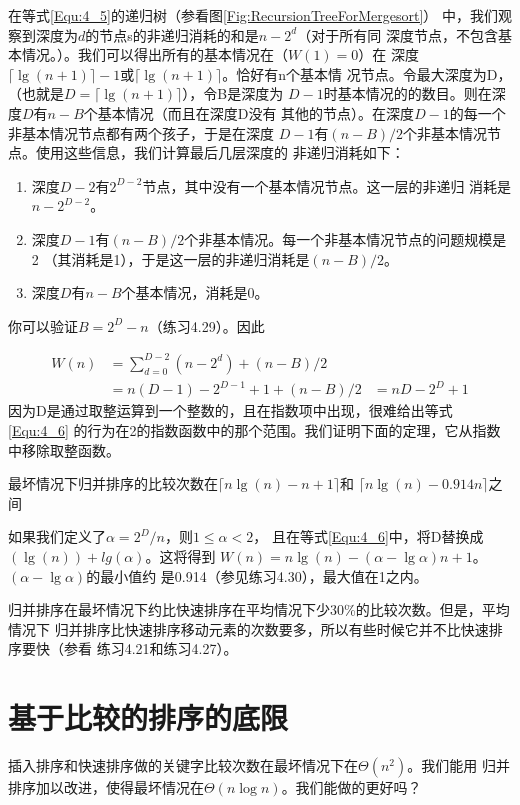 在等式\ref{Equ:4_5}的递归树（参看图\ref{Fig:RecursionTreeForMergesort}）
中，我们观察到深度为$d$的节点s的非递归消耗的和是$n-2^d$（对于所有同
深度节点，不包含基本情况。）。我们可以得出所有的基本情况在（$W(1)=0$）在
深度$\lceil \lg(n+1)\rceil -1$或$\lceil\lg(n+1) \rceil$。恰好有n个基本情
况节点。令最大深度为D，（也就是$D=\lceil\lg(n+1) \rceil$），令B是深度为
$D-1$时基本情况的的数目。则在深度$D$有$n-B$个基本情况（而且在深度D没有
其他的节点）。在深度$D-1$的每一个非基本情况节点都有两个孩子，于是在深度
$D-1$有$(n-B)/2$个非基本情况节点。使用这些信息，我们计算最后几层深度的
非递归消耗如下：
\begin{enumerate}
\item 深度$D-2$有$2^{D-2}$节点，其中没有一个基本情况节点。这一层的非递归
    消耗是$n-2^{D-2}$。
\item 深度$D-1$有$(n-B)/2$个非基本情况。每一个非基本情况节点的问题规模是2
（其消耗是1），于是这一层的非递归消耗是$(n-B)/2$。
\item 深度$D$有$n-B$个基本情况，消耗是0。
\end{enumerate}
你可以验证$B=2^D-n$（练习4.29）。因此

\begin{equation}\label{Equ:4_6}
\begin{aligned}
W(n)&=\sum_{d=0}^{D-2}(n-2^d)+(n-B)/2\\
&=n(D-1)-2^{D-1}+1+(n-B)/2
&=nD-2^D+1
\end{aligned}
\end{equation}
因为D是通过取整运算到一个整数的，且在指数项中出现，很难给出等式\ref{Equ:4_6}
的行为在2的指数函数中的那个范围。我们证明下面的定理，它从指数中移除取整函数。

\begin{theorem}\label{Theorem:4_6}
最坏情况下归并排序的比较次数在$\lceil n\lg(n)-n+1 \rceil$和
$\lceil n\lg(n)-0.914n \rceil$之间

 如果我们定义了$\alpha = 2^D/n$，则$1\leq \alpha <2$，
且在等式\ref{Equ:4_6}中，将D替换成$(\lg(n))+lg(\alpha)$。这将得到
$W(n)=n\lg(n)- (\alpha - \lg\alpha)n +1$。$(\alpha -\lg \alpha)$的最小值约
是0.914（参见练习4.30），最大值在1之内。
\end{theorem}

归并排序在最坏情况下约比快速排序在平均情况下少30\%的比较次数。但是，平均情况下
归并排序比快速排序移动元素的次数要多，所以有些时候它并不比快速排序要快（参看
练习4.21和练习4.27）。

\section{基于比较的排序的底限}\label{Sec:LowerBoundsForSortingByComparisonOfKeys}
插入排序和快速排序做的关键字比较次数在最坏情况下在$\Theta(n^2)$。我们能用
归并排序加以改进，使得最坏情况在$\Theta(n\log n)$。我们能做的更好吗？

